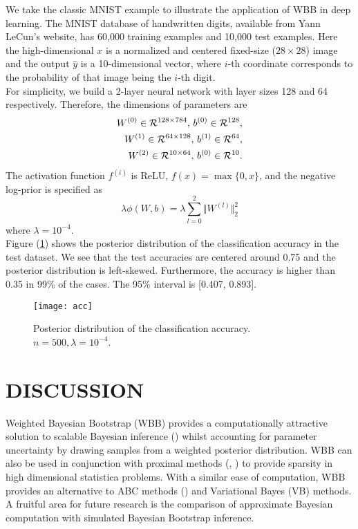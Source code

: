 \documentclass[12pt]{TD-CJS}
\begin{document}
\noindent We take the classic MNIST example to illustrate the application of WBB in deep learning. The MNIST database of handwritten digits, available from Yann LeCun's website, has 60,000 training examples and 10,000 test examples. Here the high-dimensional $x$ is a normalized and centered fixed-size ($28\times 28$) image and the output $\hat{y}$ is a 10-dimensional vector, where $i$-th coordinate corresponds to the probability of that image being the $i$-th digit.\\

\noindent For simplicity, we build a 2-layer neural network with layer sizes 128 and 64 respectively. Therefore, the dimensions of parameters are
\begin{align*}
W^{(0)} \in \mathcal{R}^{128\times 784},\, b^{(0)}\in \mathcal{R}^{128},\\
W^{(1)} \in \mathcal{R}^{64\times 128},\, b^{(1)}\in \mathcal{R}^{64},\\
W^{(2)} \in \mathcal{R}^{10\times 64},\, b^{(0)}\in \mathcal{R}^{10}.
\end{align*}
The activation function $f^{(i)}$ is ReLU, $f(x) = \max\{0,x\}$, and the negative log-prior is specified as 
$$
\lambda\phi(W,b) = \lambda\sum_{l=0}^{2}\Vert W^{(l)} \Vert_2^2
$$
where $\lambda = 10^{-4}$. \\

\noindent Figure (\ref{fig:acc}) shows the posterior distribution of the classification accuracy in the test dataset. We see that the test accuracies are centered around 0.75 and the posterior distribution is left-skewed. Furthermore, the accuracy is higher than 0.35 in 99\% of the cases. The 95\% interval is [0.407, 0.893].

\begin{figure}[!ht]
	\centering
	\texttt{[image: acc]}
	\caption{Posterior distribution of the classification accuracy. $n=500, \lambda=10^{-4}$.}
	\label{fig:acc}
\end{figure}



\section{DISCUSSION}
Weighted Bayesian Bootstrap (WBB) provides a computationally attractive solution to scalable Bayesian inference (\cite{minsker2014scalable, welling2011bayesian})
whilst accounting for parameter uncertainty by drawing  samples from a weighted posterior distribution. WBB can also be used in conjunction with proximal methods (\cite{parikh2013proximal}, \cite{polson2015proximal})
to provide  sparsity in high dimensional statistica problems. With a similar ease of computation, WBB provides an alternative to ABC methods (\cite{beaumont2009adaptive}) and Variational Bayes (VB) methods. A fruitful area for future research is the comparison of approximate Bayesian computation with simulated Bayesian Bootstrap inference.
\end{document}
